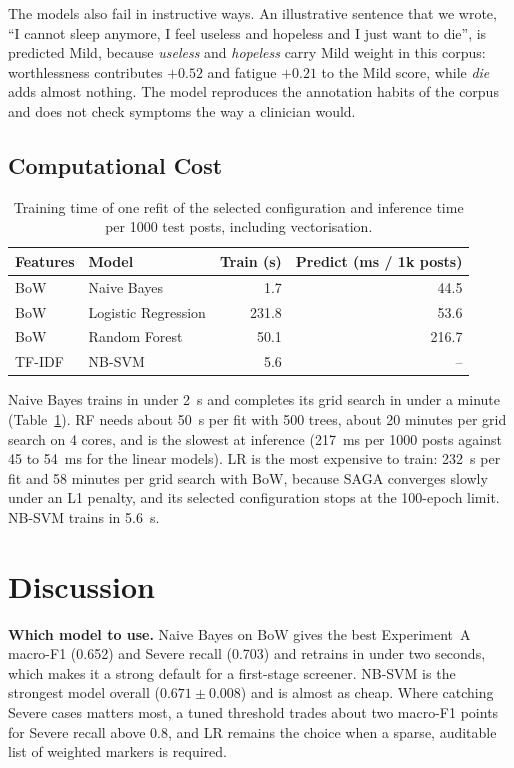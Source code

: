 \documentclass[conference]{IEEEtran}
\begin{document}
The models also fail in instructive ways. An illustrative sentence that we wrote, ``I cannot sleep anymore, I feel useless and hopeless and I just want to die'', is predicted Mild, because \textit{useless} and \textit{hopeless} carry Mild weight in this corpus: worthlessness contributes $+0.52$ and fatigue $+0.21$ to the Mild score, while \textit{die} adds almost nothing. The model reproduces the annotation habits of the corpus and does not check symptoms the way a clinician would.

\subsection{Computational Cost}

\begin{table}[!htbp]
\centering
\caption{Training time of one refit of the selected configuration and inference time per \num{1000} test posts, including vectorisation.}
\label{tab:time}
\begin{tabular}{llrr}
\toprule
Features & Model & Train (s) & Predict (ms / 1k posts) \\
\midrule
BoW & Naive Bayes & 1.7 & 44.5 \\
BoW & Logistic Regression & 231.8 & 53.6 \\
BoW & Random Forest & 50.1 & 216.7 \\
TF-IDF & NB-SVM & 5.6 & -- \\
\bottomrule
\end{tabular}
\end{table}

Naive Bayes trains in under 2~s and completes its grid search in under a minute (Table~\ref{tab:time}). RF needs about 50~s per fit with 500 trees, about 20 minutes per grid search on 4 cores, and is the slowest at inference (217~ms per \num{1000} posts against 45 to 54~ms for the linear models). LR is the most expensive to train: 232~s per fit and 58 minutes per grid search with BoW, because SAGA converges slowly under an L1 penalty, and its selected configuration stops at the 100-epoch limit. NB-SVM trains in 5.6~s.

\section{Discussion}

\textbf{Which model to use.} Naive Bayes on BoW gives the best Experiment~A macro-F1 (0.652) and Severe recall (0.703) and retrains in under two seconds, which makes it a strong default for a first-stage screener. NB-SVM is the strongest model overall ($0.671\pm0.008$) and is almost as cheap. Where catching Severe cases matters most, a tuned threshold trades about two macro-F1 points for Severe recall above 0.8, and LR remains the choice when a sparse, auditable list of weighted markers is required.
\end{document}
